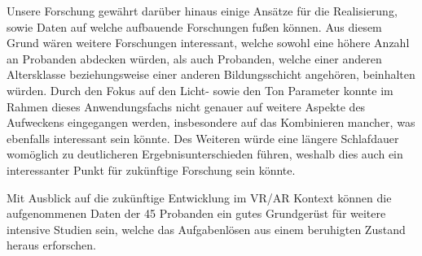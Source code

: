 Unsere Forschung gewährt darüber hinaus einige Ansätze für die Realisierung, sowie Daten auf welche aufbauende Forschungen fußen können. Aus diesem Grund wären weitere Forschungen interessant, welche sowohl eine höhere Anzahl an Probanden abdecken würden, als auch Probanden, welche einer anderen Altersklasse beziehungsweise einer anderen Bildungsschicht angehören, beinhalten würden. Durch den Fokus auf den Licht- sowie den Ton Parameter konnte im Rahmen dieses Anwendungsfachs nicht genauer auf weitere Aspekte des Aufweckens eingegangen werden, insbesondere auf das Kombinieren mancher, was ebenfalls interessant sein könnte. Des Weiteren würde eine längere Schlafdauer womöglich zu deutlicheren Ergebnisunterschieden führen, weshalb dies auch ein interessanter Punkt für zukünftige Forschung sein könnte.

Mit Ausblick auf die zukünftige Entwicklung im VR/AR Kontext können die aufgenommenen Daten der 45 Probanden ein gutes Grundgerüst für weitere intensive Studien sein, welche das Aufgabenlösen aus einem beruhigten Zustand heraus erforschen.